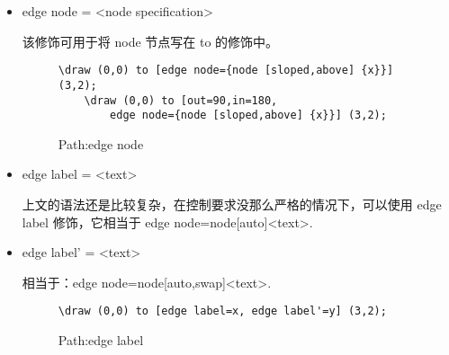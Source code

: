 \begin{itemize}
    \item edge node = <node specification>
    
    该修饰可用于将 node 节点写在 to 的修饰中。
    \begin{figure}[H]
        \centering
        \begin{minipage}{0.35\linewidth}
            \centering
        \end{minipage}
        \begin{minipage}{0.55\linewidth}
            \begin{lstlisting}[style = latex-side]
    \draw (0,0) to [edge node={node [sloped,above] {x}}] (3,2);
    \draw (0,0) to [out=90,in=180,
        edge node={node [sloped,above] {x}}] (3,2);
            \end{lstlisting}
        \end{minipage}
        \caption{Path:edge node}
    \end{figure}

    \item edge label = <text>
    
    上文的语法还是比较复杂，在控制要求没那么严格的情况下，可以使用 edge label 修饰，它相当于 edge node={node[auto]{<text>}}.

    \item edge label' = <text>
    
    相当于：edge node={node[auto,swap]{<text>}}.

    \begin{figure}[H]
        \centering
        \begin{minipage}{0.35\linewidth}
            \centering
        \end{minipage}
        \begin{minipage}{0.55\linewidth}
            \begin{lstlisting}[style = latex-side]
    \draw (0,0) to [edge label=x, edge label'=y] (3,2);
            \end{lstlisting}
        \end{minipage}
        \caption{Path:edge label}
    \end{figure}

\end{itemize}


